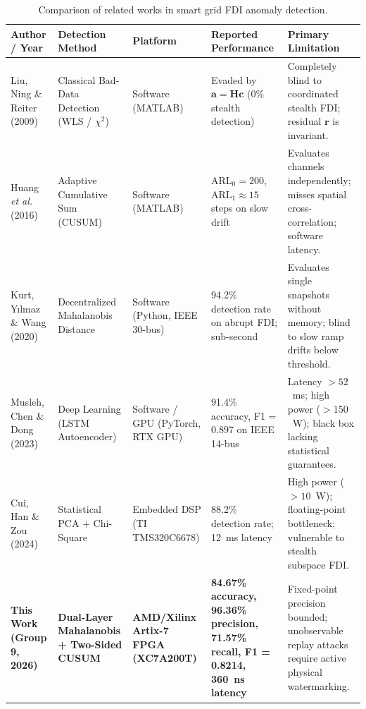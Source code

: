 \documentclass[12pt,a4paper]{report}
\begin{document}
\begin{table}[H]
\centering
\caption{Comparison of related works in smart grid FDI anomaly detection.}
\label{tab:priorwork}
\small
\renewcommand{\arraystretch}{1.3}
\begin{tabular}{|p{2.6cm}|p{2.4cm}|p{2.2cm}|p{3.2cm}|p{3.6cm}|}
\hline
\textbf{Author / Year} & \textbf{Detection Method} & \textbf{Platform} & \textbf{Reported Performance} & \textbf{Primary Limitation} \\
\hline
Liu, Ning \& Reiter (2009) \cite{liu2009} & Classical Bad-Data Detection (WLS / $\chi^2$) & Software (MATLAB) & Evaded by $\boldsymbol{a}=\boldsymbol{H}\boldsymbol{c}$ (0\% stealth detection) & Completely blind to coordinated stealth FDI; residual $\boldsymbol{r}$ is invariant. \\
\hline
Huang \textit{et al.} (2016) \cite{huang2016} & Adaptive Cumulative Sum (CUSUM) & Software (MATLAB) & $\text{ARL}_0 = 200$, $\text{ARL}_1 \approx 15$ steps on slow drift & Evaluates channels independently; misses spatial cross-correlation; software latency. \\
\hline
Kurt, Y\i lmaz \& Wang (2020) \cite{kurt2020} & Decentralized Mahalanobis Distance & Software (Python, IEEE 30-bus) & 94.2\% detection rate on abrupt FDI; sub-second & Evaluates single snapshots without memory; blind to slow ramp drifts below threshold. \\
\hline
Musleh, Chen \& Dong (2023) \cite{musleh2023} & Deep Learning (LSTM Autoencoder) & Software / GPU (PyTorch, RTX GPU) & 91.4\% accuracy, F1 = 0.897 on IEEE 14-bus & Latency $> 52$~ms; high power ($> 150$~W); black box lacking statistical guarantees. \\
\hline
Cui, Han \& Zou (2024) \cite{cui2024} & Statistical PCA + Chi-Square & Embedded DSP (TI TMS320C6678) & 88.2\% detection rate; 12~ms latency & High power ($> 10$~W); floating-point bottleneck; vulnerable to stealth subspace FDI. \\
\hline
\textbf{This Work (Group 9, 2026)} & \textbf{Dual-Layer Mahalanobis + Two-Sided CUSUM} & \textbf{AMD/Xilinx Artix-7 FPGA (XC7A200T)} & \textbf{84.67\% accuracy, 96.36\% precision, 71.57\% recall, F1 = 0.8214, 360~ns latency} & Fixed-point precision bounded; unobservable replay attacks require active physical watermarking. \\
\hline
\end{tabular}
\end{table}
\end{document}
